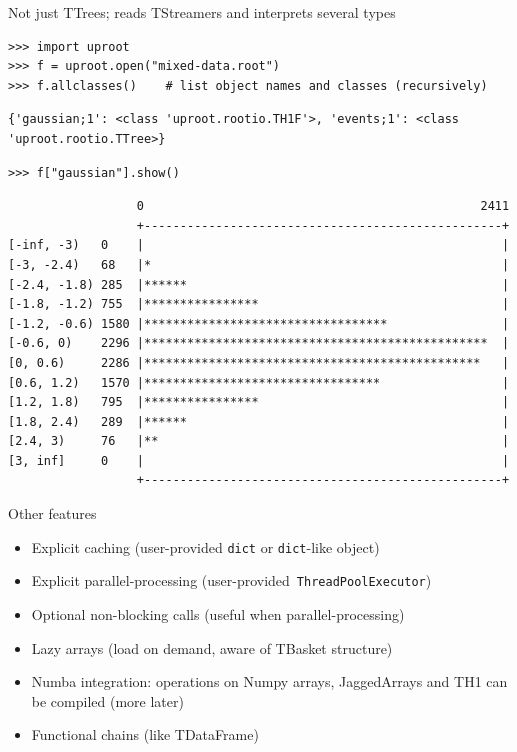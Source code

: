 \documentclass[aspectratio=169]{beamer}
\begin{document}
\begin{frame}[fragile]{Not just TTrees; reads TStreamers and interprets several types}
\vspace{0.1 cm}
\small
\begin{verbatim}
>>> import uproot
>>> f = uproot.open("mixed-data.root")
>>> f.allclasses()    # list object names and classes (recursively)
\end{verbatim}
\scriptsize
\begin{verbatim}
{'gaussian;1': <class 'uproot.rootio.TH1F'>, 'events;1': <class 'uproot.rootio.TTree>}
\end{verbatim}
\small
\begin{verbatim}
>>> f["gaussian"].show()
\end{verbatim}
\scriptsize
\begin{verbatim}
                  0                                               2411
                  +--------------------------------------------------+
[-inf, -3)   0    |                                                  |
[-3, -2.4)   68   |*                                                 |
[-2.4, -1.8) 285  |******                                            |
[-1.8, -1.2) 755  |****************                                  |
[-1.2, -0.6) 1580 |**********************************                |
[-0.6, 0)    2296 |************************************************  |
[0, 0.6)     2286 |***********************************************   |
[0.6, 1.2)   1570 |*********************************                 |
[1.2, 1.8)   795  |****************                                  |
[1.8, 2.4)   289  |******                                            |
[2.4, 3)     76   |**                                                |
[3, inf]     0    |                                                  |
                  +--------------------------------------------------+
\end{verbatim}
\end{frame}

\begin{frame}{Other features}
\vspace{0.5 cm}
\Large
\begin{itemize}\setlength{\itemsep}{0.25 cm}
\item Explicit caching (user-provided {\large\tt dict} or {\large\tt dict}-like object)
\item Explicit parallel-processing \mbox{(user-provided {\large\tt ThreadPoolExecutor})\hspace{-1 cm}}
\item Optional non-blocking calls (useful when parallel-processing)
\item Lazy arrays (load on demand, aware of TBasket structure)
\item Numba integration: operations on Numpy arrays, JaggedArrays and TH1 can be compiled (more later)
\item Functional chains (like TDataFrame)
\end{itemize}
\end{frame}
\end{document}
